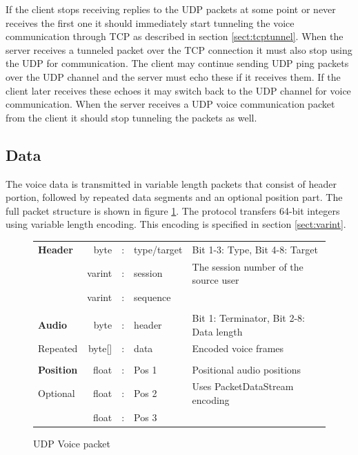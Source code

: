 \documentclass[11pt]{article} %
\begin{document}
If the client stops receiving replies to the UDP packets at some point or never receives the first one it should immediately start tunneling the voice communication through TCP as described in section \ref{sect:tcptunnel}. When the server receives a tunneled packet over the TCP connection it must also stop using the UDP for communication. The client may continue sending UDP ping packets over the UDP channel and the server must echo these if it receives them. If the client later receives these echoes it may switch back to the UDP channel for voice communication. When the server receives a UDP voice communication packet from the client it should stop tunneling the packets as well.

\subsection{Data}

The voice data is transmitted in variable length packets that consist of header portion, followed by repeated data segments and an optional position part. The full packet structure is shown in figure \ref{fig:udpvoice}. The protocol transfers 64-bit integers using variable length encoding. This encoding is specified in section \ref{sect:varint}.

\begin{figure}[htp]\begin{center}\begin{tabular}{l|rcl|p{}}

\cline{2-4}
\textbf{Header} & byte &:& type/target & Bit 1-3: Type, Bit 4-8: Target \\
				\cline{2-4}
				& varint &:& session & The session number of the source user \\
				\cline{2-4}
				& varint &:& sequence & \\
				\cline{2-4}
\multicolumn{5}{c}{} \\
				\cline{2-4}
\textbf{Audio}	& byte &:& header & Bit 1: Terminator, Bit 2-8: Data length \\
				\cline{2-4}
Repeated		& byte[] &:& data & Encoded voice frames\\
				\cline{2-4}
\multicolumn{5}{c}{} \\
				\cline{2-4}

\textbf{Position} & float &:& Pos 1 & Positional audio positions \\
				\cline{2-4}
Optional		& float &:& Pos 2 & Uses PacketDataStream encoding \\
				\cline{2-4}
				& float &:& Pos 3 & \\
				\cline{2-4}

\end{tabular}
\caption{UDP Voice packet}\label{fig:udpvoice}
\end{center}\end{figure}
\end{document}
